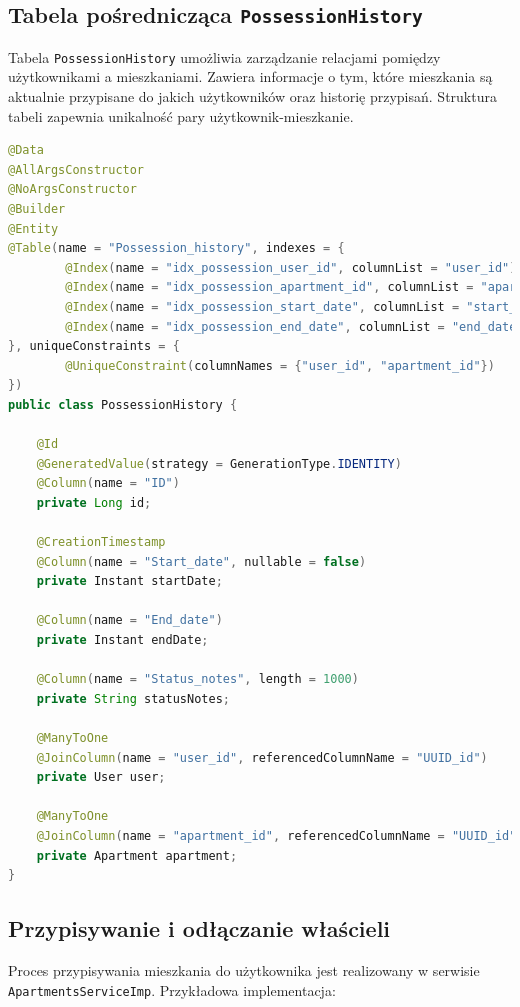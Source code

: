 \subsection{Tabela pośrednicząca \texttt{PossessionHistory}}

Tabela \texttt{PossessionHistory} umożliwia zarządzanie relacjami pomiędzy użytkownikami a mieszkaniami. Zawiera informacje o tym, które mieszkania są aktualnie przypisane do jakich użytkowników oraz historię przypisań. Struktura tabeli zapewnia unikalność pary użytkownik-mieszkanie.

\begin{lstlisting}[language=Java, style=JavaStyle, caption=Tabela pośrednicząca \texttt{PossessionHistory}]
@Data
@AllArgsConstructor
@NoArgsConstructor
@Builder
@Entity
@Table(name = "Possession_history", indexes = {
        @Index(name = "idx_possession_user_id", columnList = "user_id"),
        @Index(name = "idx_possession_apartment_id", columnList = "apartment_id"),
        @Index(name = "idx_possession_start_date", columnList = "start_date"),
        @Index(name = "idx_possession_end_date", columnList = "end_date")
}, uniqueConstraints = {
        @UniqueConstraint(columnNames = {"user_id", "apartment_id"})
})
public class PossessionHistory {

    @Id
    @GeneratedValue(strategy = GenerationType.IDENTITY)
    @Column(name = "ID")
    private Long id;

    @CreationTimestamp
    @Column(name = "Start_date", nullable = false)
    private Instant startDate;

    @Column(name = "End_date")
    private Instant endDate;

    @Column(name = "Status_notes", length = 1000)
    private String statusNotes;

    @ManyToOne
    @JoinColumn(name = "user_id", referencedColumnName = "UUID_id")
    private User user;

    @ManyToOne
    @JoinColumn(name = "apartment_id", referencedColumnName = "UUID_id")
    private Apartment apartment;
}
\end{lstlisting}

\subsection{Przypisywanie i odłączanie właścieli}

Proces przypisywania mieszkania do użytkownika jest realizowany w serwisie \texttt{ApartmentsServiceImp}. Przykładowa implementacja:

